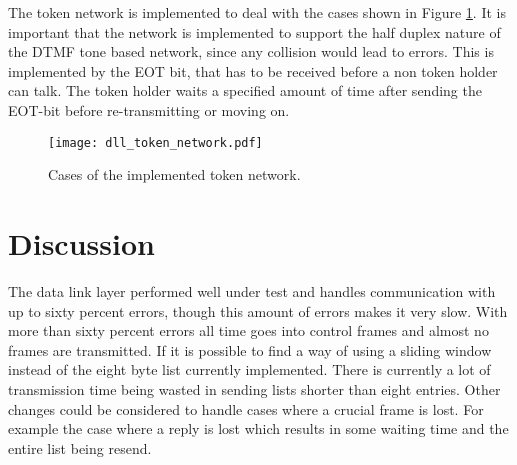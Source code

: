 The token network is implemented to deal with the cases shown in Figure
\ref{fig:dll_token_network}. It is important that the network is implemented to
support the half duplex nature of the DTMF tone based network, since any
collision would lead to errors. This is implemented by the EOT bit, that has to
be received before a non token holder can talk. The token holder waits a specified
amount of time after sending the EOT-bit before re-transmitting or moving on.

\begin{figure}[htb]
	\begin{center}
	\texttt{[image: dll\_token\_network.pdf]}
	\caption{Cases of the implemented token network.}
	\label{fig:dll_token_network}	
	\end{center}
\end{figure}

\section{Discussion}
The data link layer performed well under test and handles communication with up to sixty percent errors, though this amount of errors makes it very slow. With more than sixty percent errors all time goes into control frames and almost no frames are transmitted.
If it is possible to find a way of using a sliding window instead of the eight byte list currently implemented. There is currently a lot of transmission time being wasted in sending lists shorter than eight entries. Other changes could be considered to handle cases where a crucial frame is lost. For example the case where a reply is lost which results in some waiting time and the entire list being resend.